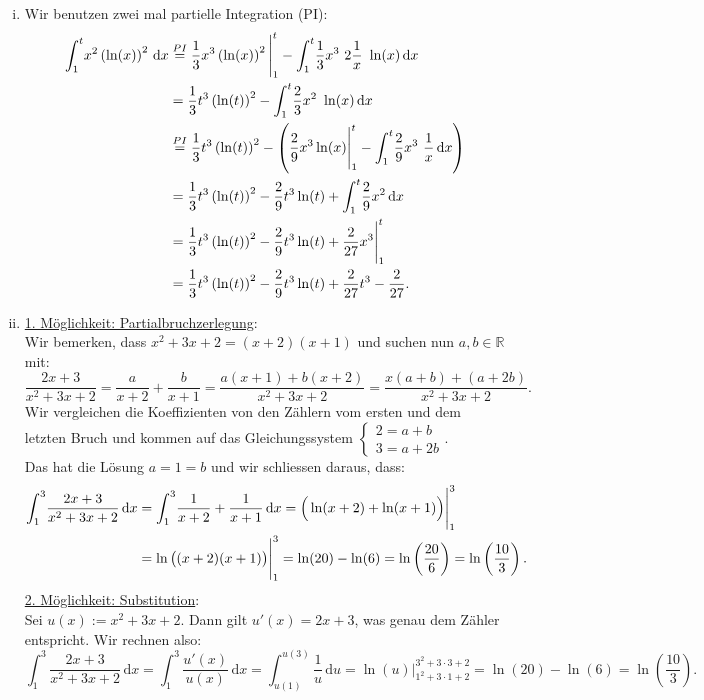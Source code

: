 \documentclass[a4paper, 20]{exam}
\newcommand\RR{\mathbb{R}}
\begin{document}
\begin{solution}
\begin{enumerate}[i.)]
\item
Wir benutzen zwei mal partielle Integration (PI):
\begin{equation}
\begin{aligned}
\int_1^t \! x^2 \left( \ln(x) \right) ^2 \, \mathrm{d}x 
& \stackrel{PI}{=} \frac{1}{3}x^3\left( \ln(x) \right) ^2 {\Bigg|} ^t_1 - \int_1^t \! \frac{1}{3}x^3 ~ 2 \frac{1}{x}~ \ln(x) \, \mathrm{d}x\\
&=\frac{1}{3}t^3\left( \ln(t) \right) ^2-\int_1^t \! \frac{2}{3}x^2 ~ \ln(x) \, \mathrm{d}x\\
& \stackrel{PI}{=}\frac{1}{3}t^3\left( \ln(t) \right) ^2 - \left( \frac{2}{9} x^3 \ln(x){\Bigg|} ^t_1 - \int_1^t \! \frac{2}{9}x^3 ~ \frac{1}{x} \, \mathrm{d}x
\right)\\
&= \frac{1}{3}t^3\left( \ln(t) \right) ^2 - \frac{2}{9} t^3 \ln(t) + \int_1^t \! \frac{2}{9}x^2 \, \mathrm{d}x\\
&= \frac{1}{3}t^3\left( \ln(t) \right) ^2 - \frac{2}{9} t^3 \ln(t) + \frac{2}{27}x^3{\Bigg|} ^t_1\\
&= \frac{1}{3}t^3\left( \ln(t) \right) ^2 - \frac{2}{9} t^3 \ln(t) + \frac{2}{27}t^3 -\frac{2}{27}.
\notag
\end{aligned}
\end{equation}

\item
\underline{1. Möglichkeit: Partialbruchzerlegung}:\\
Wir bemerken, dass $x^2+3x+2= (x+2)(x+1)$ und suchen nun $a,b \in \RR$ mit:
$$ \frac{2x+3}{x^2+3x+2} = \frac{a}{x+2} + \frac{b}{x+1} = \frac{a(x+1) +b(x+2)}{x^2+3x+2} = \frac{x(a+b) +(a+2b)}{x^2+3x+2}.$$
Wir vergleichen die Koeffizienten von den Zählern vom ersten und dem letzten Bruch und kommen auf das Gleichungssystem
$\begin{cases} 2=a+b \\ 3=a+2b \end{cases}$.\\
Das hat die Lösung $a=1=b$ und wir schliessen daraus, dass:
\begin{equation}
\begin{aligned}
\int_1^3 \! \frac{2x+3}{x^2+3x+2} \, \mathrm{d}x 
&= \int_1^3 \! \frac{1}{x+2} + \frac{1}{x+1} \, \mathrm{d}x = \Big( \ln(x+2) + \ln(x+1) \Big){\Bigg|} ^3_1\\
&= \ln\big((x+2)(x+1)\big){\Bigg|} ^3_1
= \ln(20)-\ln(6)= \ln\left(\frac{20}{6}\right)= \ln\left(\frac{10}{3}\right).
\notag
\end{aligned}
\end{equation}
\underline{2. Möglichkeit: Substitution}:\\
Sei $u(x):= x^2+3x+2$. Dann gilt $u'(x)= 2x+3$, was genau dem Zähler entspricht. Wir rechnen also:
$$\int_1^3 \! \frac{2x+3}{x^2+3x+2} \, \mathrm{d}x 
= \int_1^3 \! \frac{u'(x)}{u(x)} \, \mathrm{d}x 
= \int_{u(1)}^{u(3)} \! \frac{1}{u} \, \mathrm{d}u
= \ln(u) {\Bigg|} ^{3^2+3\cdot3+2}_{1^2 +3\cdot1+2}
= \ln(20)-\ln(6)=  \ln\left(\frac{10}{3}\right).$$


\end{enumerate}
\end{solution}
\end{document}
